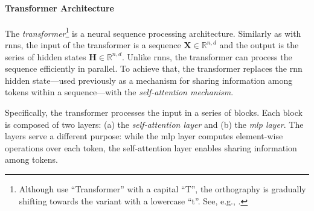 {%




\paragraph{Transformer Architecture} The \emph{transformer}\footnote{Although \citet{vaswani2017attention} use ``Transformer'' with a capital ``T'', the orthography is gradually shifting towards the variant with a lowercase ``t''. See, e.g., \citet[p.~215]{jurafsky2024}.} \cite{vaswani2017attention} is a neural sequence processing architecture. Similarly as with \acp{rnn}, the input of the transformer is a sequence $\mathbf{X} \in \mathbb{R}^{n,d}$ and the output is the series of hidden states $\mathbf{H} \in \mathbb{R}^{n,d}$. Unlike \acp{rnn}, the transformer can process the sequence efficiently in parallel. To achieve that, the transformer replaces the \ac{rnn} hidden state---used previously as a mechanism for sharing information among tokens within a sequence---with the \emph{self-attention mechanism}.

Specifically, the transformer processes the input in a series of blocks. Each block is composed of two layers: (a) the \emph{self-attention layer} and (b) the \emph{\ac{mlp} layer}. The layers serve a different purpose: while the \ac{mlp} layer computes element-wise operations over each token, the self-attention layer enables sharing information among tokens.

}

